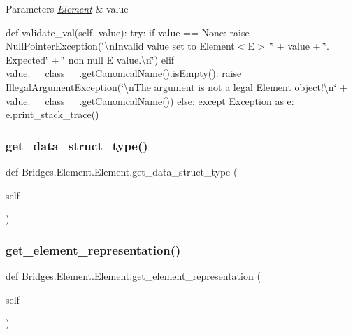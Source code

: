 \begin{DoxyParams}{Parameters}
{\em \mbox{\hyperlink{class_bridges_1_1_element_1_1_element}{Element}}} & value\\
\hline
\end{DoxyParams}
def validate\+\_\+val(self, value)\+: try\+: if value == None\+: raise Null\+Pointer\+Exception(\char`\"{}\textbackslash{}n\+Invalid value set to Element$<$\+E$>$ \textquotesingle{}\char`\"{} + value + \char`\"{}\textquotesingle{}. Expected\char`\"{} + \char`\"{} non null E value.\textbackslash{}n\char`\"{}) elif value.\+\_\+\+\_\+class\+\_\+\+\_\+.\+get\+Canonical\+Name().is\+Empty()\+: raise Illegal\+Argument\+Exception(\char`\"{}\textbackslash{}n\+The argument is not a legal Element object!\textbackslash{}n\char`\"{} + value.\+\_\+\+\_\+class\+\_\+\+\_\+.\+get\+Canonical\+Name()) else\+: except Exception as e\+: e.\+print\+\_\+stack\+\_\+trace() \mbox{\label{class_bridges_1_1_element_1_1_element_a3e2a72a74d5cab317aede86b226a4a49}} 
\subsubsection{\texorpdfstring{get\+\_\+data\+\_\+struct\+\_\+type()}{get\_data\_struct\_type()}}
{\footnotesize\ttfamily def Bridges.\+Element.\+Element.\+get\+\_\+data\+\_\+struct\+\_\+type (\begin{DoxyParamCaption}\item[{}]{self }\end{DoxyParamCaption})}

\mbox{\label{class_bridges_1_1_element_1_1_element_ad636092154a89fab2488e9e4dcb139fd}} 
\subsubsection{\texorpdfstring{get\+\_\+element\+\_\+representation()}{get\_element\_representation()}}
{\footnotesize\ttfamily def Bridges.\+Element.\+Element.\+get\+\_\+element\+\_\+representation (\begin{DoxyParamCaption}\item[{}]{self }\end{DoxyParamCaption})}

